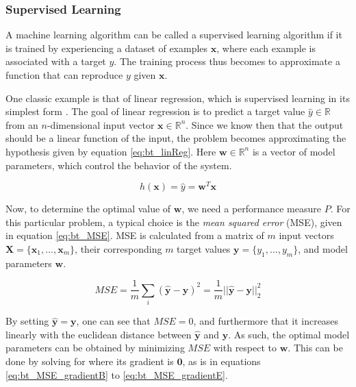 \subsubsection{Supervised Learning}

A machine learning algorithm can be called a supervised learning algorithm if it is trained by experiencing a dataset of examples $\bm{x}$, where each example is associated with a target $y$. The training process thus becomes to approximate a function that can reproduce $y$ given $\bm{x}$.

One classic example is that of linear regression, which is supervised learning in its simplest form \cite{goodfellow2016}. The goal of linear regression is to predict a target value $\hat{y}\in\mathbb{R}$ from an $n$-dimensional input vector $\bm{x}\in\mathbb{R}^n$. Since we know then that the output should be a linear function of the input, the problem becomes approximating the hypothesis given by equation \ref{eq:bt_linReg}. Here $\bm{w}\in\mathbb{R}^n$ is a vector of model parameters, which control the behavior of the system.

\begin{equation}
    \label{eq:bt_linReg}
    h(\bm{x})=\hat{y}=\bm{w}^T\bm{x}
\end{equation}

Now, to determine the optimal value of $\bm{w}$, we need a performance measure $P$. For this particular problem, a typical choice is the \textit{mean squared error} (MSE), given in equation \ref{eq:bt_MSE}. MSE is calculated from a matrix of $m$ input vectors $\bm{X}=\{\bm{x}_1,\dots,\bm{x}_m\}$, their corresponding $m$ target values $\bm{y}=\{y_1,\dots,y_m\}$, and model parameters $\bm{w}$.

\begin{equation}
    \label{eq:bt_MSE}
    MSE=\frac{1}{m}\sum_{i}(\hat{\bm{y}}-\bm{y})^2
    =\frac{1}{m}||\hat{\bm{y}}-\bm{y}||^2_2
\end{equation}

By setting $\hat{\bm{y}}=\bm{y}$, one can see that $MSE=0$, and furthermore that it increases linearly with the euclidean distance between $\hat{\bm{y}}$ and $\bm{y}$. As such, the optimal model parameters can be obtained by minimizing $MSE$ with respect to $\bm{w}$. This can be done by solving for where its gradient is $\bm{0}$, as is in equations \ref{eq:bt_MSE_gradientB} to \ref{eq:bt_MSE_gradientE}.

